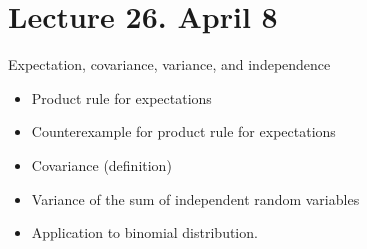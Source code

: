 \documentclass[letterpaper,11pt,oneside,reqno]{amsart}
\numberwithin{equation}{section}
\theoremstyle{definition}
\begin{document}
\section*{Lecture 26. April 8}

Expectation, covariance, variance, and independence
\begin{itemize}
	\item Product rule for expectations
	\item Counterexample for product rule for expectations
	\item Covariance (definition)
	\item Variance of the sum of independent random variables
	\item Application to binomial distribution.
\end{itemize}
\end{document}
